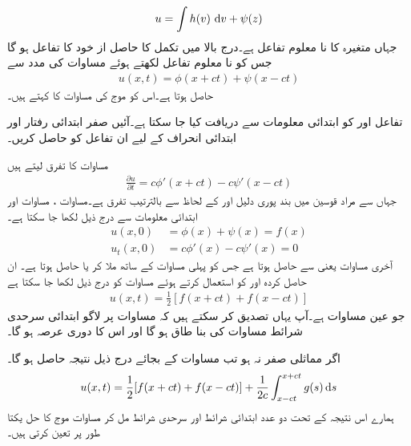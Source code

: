 \begin{align*}
u=\int h(v)\,\dif v+\psi(z)
\end{align*}
جہاں  متغیرہ  کا نا معلوم تفاعل ہے۔درج بالا میں تکمل کا حاصل از خود  کا تفاعل ہو گا جس کو نا معلوم تفاعل   لکھتے ہوئے مساوات  کی مدد سے 
\begin{align}\label{مساوات_جزوی_موج_مساوات_ت}
u(x,t)=\phi(x+ct)+\psi(x-ct)
\end{align}
حاصل ہوتا ہے۔اس کو موج کی مساوات  کا  کہتے ہیں۔

تفاعل  اور  کو ابتدائی معلومات سے دریافت کیا جا سکتا ہے۔آئیں صفر ابتدائی رفتار اور ابتدائی انحراف  کے لیے ان تفاعل کو حاصل کریں۔

مساوات  کا تفرق لیتے ہیں
\begin{align}\label{مساوات_جزوی_موج_مساوات_ٹ}
\frac{\partial u}{\partial t}=c\phi'(x+ct)-c\psi'(x-ct)
\end{align}
جہاں  سے مراد قوسین میں بند پوری دلیل  اور  کے لحاظ سے بالترتیب  تفرق ہے۔مساوات ، مساوات  اور ابتدائی معلومات سے درج ذیل لکھا جا سکتا ہے۔
\begin{align*}
u(x,0)&=\phi(x)+\psi(x)=f(x)\\
u_t(x,0)&=c\phi'(x)-c\psi'(x)=0
\end{align*} 
آخری مساوات یعنی  سے  حاصل ہوتا ہے  جس کو پہلی مساوات کے ساتھ ملا کر  یا  حاصل ہوتا ہے۔ ان حاصل کردہ  اور   کو استعمال کرتے ہوئے مساوات  کو درج ذیل لکھا جا سکتا ہے
\begin{align}\label{مساوات_جزوی_موج_مساوات_ث}
u(x,t)=\frac{1}{2}[f(x+ct)+f(x-ct)]
\end{align}
جو عین مساوات  ہے۔آپ یہاں تصدیق کر سکتے ہیں کہ مساوات  پر لاگو  ابتدائی سرحدی شرائط مساوات  کی بنا  طاق ہو گا اور اس کا دوری عرصہ  ہو گا۔

اگر  مماثلی صفر نہ ہو تب مساوات  کے بجائے درج ذیل نتیجہ  حاصل ہو گا۔
\begin{align}\label{مساوات_جزوی_موج_مساوات_ج}
u(x,t)=\frac{1}{2}[f(x+ct)+f(x-ct)]+\frac{1}{2c}\int_{x-ct}^{x+ct} g(s)\dif s
\end{align}
ہمارے اس نتیجہ کے تحت دو عدد ابتدائی شرائط اور سرحدی شرائط مل کر مساوات موج کا حل یکتا طور پر تعین کرتی ہیں۔ 

